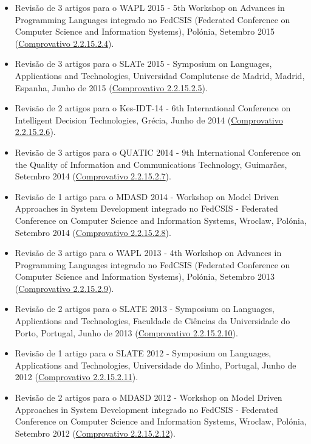 \documentclass[11pt]{article}
\begin{document}
\begin{itemize}
\item {Revisão de 3 artigos para o WAPL 2015 - 5th Workshop on Advances in Programming Languages integrado no FedCSIS (Federated Conference on Computer Science and Information Systems), Polónia, Setembro 2015 (\href{run:ComprovativosCOCP/revisoes/WAPL2015.pdf}{Comprovativo 2.2.15.2.4}).}
\item {Revisão de 3 artigos para o SLATe 2015 - Symposium on Languages, Applications and Technologies, Universidad Complutense de Madrid, Madrid, Espanha, Junho de 2015 (\href{run:ComprovativosCOCP/revisoes/SLATE2015.pdf}{Comprovativo 2.2.15.2.5}).}
\item {Revisão de 2 artigos para o Kes-IDT-14 - 6th International Conference on Intelligent Decision Technologies, Grécia, Junho de 2014 (\href{run:ComprovativosCOCP/revisoes/kesidt2014.pdf}{Comprovativo 2.2.15.2.6}).}
\item {Revisão de 3 artigos para o QUATIC 2014 - 9th International Conference on the Quality of Information and Communications Technology, Guimarães, Setembro 2014 (\href{run:ComprovativosCOCP/revisoes/QUATIC2014.pdf}{Comprovativo 2.2.15.2.7}).}
\item {Revisão de 1 artigo para o MDASD 2014 - Workshop on Model Driven Approaches in System Development integrado no FedCSIS - Federated Conference on Computer Science and Information Systems, Wroclaw, Polónia, Setembro 2014 (\href{run:ComprovativosCOCP/revisoes/MDASD2014.pdf}{Comprovativo 2.2.15.2.8}).}
\item {Revisão de 3 artigo para o WAPL 2013 - 4th Workshop on Advances in Programming Languages integrado no FedCSIS (Federated Conference on Computer Science and Information Systems), Polónia, Setembro 2013 (\href{run:ComprovativosCOCP/revisoes/WAPL2013.pdf}{Comprovativo 2.2.15.2.9}).}
\item {Revisão de 2 artigos para o SLATE 2013 - Symposium on Languages, Applications and Technologies, Faculdade de Ciências da Universidade do Porto, Portugal, Junho de 2013 (\href{run:ComprovativosCOCP/revisoes/SLATE2013.pdf}{Comprovativo 2.2.15.2.10}).}
\item {Revisão de 1 artigo para o SLATE 2012 - Symposium on Languages, Applications and Technologies, Universidade do Minho, Portugal, Junho de 2012 (\href{run:ComprovativosCOCP/revisoes/SLATE2012.pdf}{Comprovativo 2.2.15.2.11}).}
\item {Revisão de 2 artigos para o MDASD 2012 - Workshop on Model Driven Approaches in System Development integrado no FedCSIS - Federated Conference on Computer Science and Information Systems, Wroclaw, Polónia, Setembro 2012 (\href{run:ComprovativosCOCP/revisoes/MDASD2012.pdf}{Comprovativo 2.2.15.2.12}).}

\end{itemize}
\end{document}
